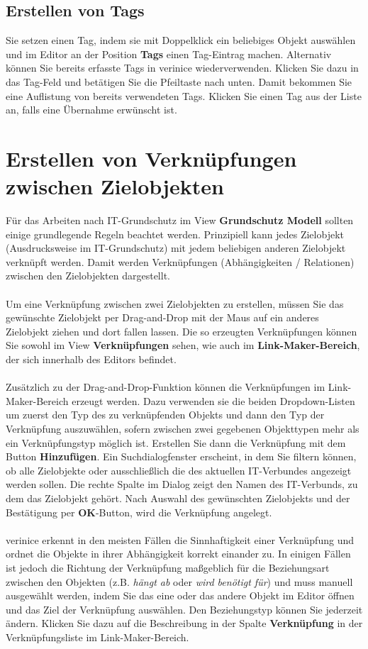 \documentclass[a4paper,10pt]{book}
\begin{document}
\subsection{Erstellen von Tags}
Sie setzen einen Tag, indem sie mit Doppelklick ein beliebiges Objekt
auswählen und im Editor an der Position \textbf{Tags} einen
Tag-Eintrag machen.  Alternativ können Sie bereits erfasste Tags in
verinice wiederverwenden.  Klicken Sie dazu in das Tag-Feld und
betätigen Sie die Pfeiltaste nach unten.  Damit bekommen Sie eine
Auflistung von bereits verwendeten Tags. Klicken Sie einen Tag aus der
Liste an, falls eine Übernahme erwünscht ist.

\section{Erstellen von Verknüpfungen zwischen Zielobjekten}
\label{sec:bsiView_dd}
Für das Arbeiten nach IT-Grundschutz im View \textbf{Grundschutz
  Modell} sollten einige grundlegende Regeln beachtet werden.
Prinzipiell kann jedes Zielobjekt (Ausdrucksweise im IT-Grundschutz)
mit jedem beliebigen anderen Zielobjekt verknüpft werden.  Damit
werden Verknüpfungen (Abhängigkeiten / Relationen) zwischen den
Zielobjekten dargestellt.
\\\\
Um eine Verknüpfung zwischen zwei Zielobjekten zu erstellen, müssen
Sie das gewünschte Zielobjekt per Drag-and-Drop mit der Maus auf ein
anderes Zielobjekt ziehen und dort fallen lassen. Die so erzeugten
Verknüpfungen können Sie sowohl im View \textbf{Verknüpfungen} sehen,
wie auch im \textbf{Link-Maker-Bereich}, der sich innerhalb des
Editors befindet.
\\\\
Zusätzlich zu der Drag-and-Drop-Funktion können die Verknüpfungen im
Link-Maker-Bereich erzeugt werden. Dazu verwenden sie die beiden
Dropdown-Listen um zuerst den Typ des zu verknüpfenden Objekts und
dann den Typ der Verknüpfung auszuwählen, sofern zwischen zwei
gegebenen Objekttypen mehr als ein Verknüpfungstyp möglich
ist. Erstellen Sie dann die Verknüpfung mit dem Button
\textbf{Hinzufügen}. Ein Suchdialogfenster erscheint, in dem Sie
filtern können, ob alle Zielobjekte oder ausschließlich die des
aktuellen IT-Verbundes angezeigt werden sollen. Die rechte Spalte im
Dialog zeigt den Namen des IT-Verbunds, zu dem das Zielobjekt
gehört. Nach Auswahl des gewünschten Zielobjekts und der Bestätigung
per \textbf{OK}-Button, wird die Verknüpfung angelegt.
\\\\
verinice erkennt in den meisten Fällen die Sinnhaftigkeit einer
Verknüpfung und ordnet die Objekte in ihrer Abhängigkeit korrekt
einander zu. In einigen Fällen ist jedoch die Richtung der Verknüpfung
maßgeblich für die Beziehungsart zwischen den Objekten
(z.B. \textit{hängt ab} oder \textit{wird benötigt für}) und muss
manuell ausgewählt werden, indem Sie das eine oder das andere Objekt
im Editor öffnen und das Ziel der Verknüpfung auswählen. Den
Beziehungstyp können Sie jederzeit ändern. Klicken Sie dazu auf die
Beschreibung in der Spalte \textbf{Verknüpfung} in der
Verknüpfungsliste im Link-Maker-Bereich.
\end{document}
